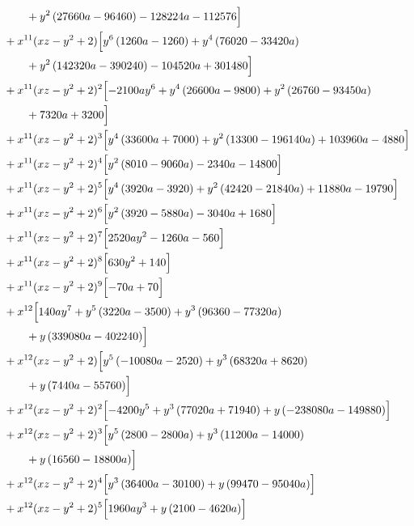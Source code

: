 \begin{align*}
&\qquad + y^{2} \left(27660 a - 96460\right) - 128224 a - 112576\Bigr]\\
&{}+x^{11}(xz-y^2+2)\Bigl[y^{6} \left(1260 a - 1260\right) + y^{4} \left(76020 - 33420 a\right)\\
&\qquad + y^{2} \left(142320 a - 390240\right) - 104520 a + 301480\Bigr]\\
&{}+x^{11}(xz-y^2+2)^{2}\Bigl[- 2100 a y^{6} + y^{4} \left(26600 a - 9800\right) + y^{2} \left(26760 - 93450 a\right)\\
&\qquad + 7320 a + 3200\Bigr]\\
&{}+x^{11}(xz-y^2+2)^{3}\Bigl[y^{4} \left(33600 a + 7000\right) + y^{2} \left(13300 - 196140 a\right) + 103960 a - 4880\Bigr]\\
&{}+x^{11}(xz-y^2+2)^{4}\Bigl[y^{2} \left(8010 - 9060 a\right) - 2340 a - 14800\Bigr]\\
&{}+x^{11}(xz-y^2+2)^{5}\Bigl[y^{4} \left(3920 a - 3920\right) + y^{2} \left(42420 - 21840 a\right) + 11880 a - 19790\Bigr]\\
&{}+x^{11}(xz-y^2+2)^{6}\Bigl[y^{2} \left(3920 - 5880 a\right) - 3040 a + 1680\Bigr]\\
&{}+x^{11}(xz-y^2+2)^{7}\Bigl[2520 a y^{2} - 1260 a - 560\Bigr]\\
&{}+x^{11}(xz-y^2+2)^{8}\Bigl[630 y^{2} + 140\Bigr]\\
&{}+x^{11}(xz-y^2+2)^{9}\Bigl[- 70 a + 70\Bigr]\\
&{}+x^{12}\Bigl[140 a y^{7} + y^{5} \left(3220 a - 3500\right) + y^{3} \left(96360 - 77320 a\right)\\
&\qquad + y \left(339080 a - 402240\right)\Bigr]\\
&{}+x^{12}(xz-y^2+2)\Bigl[y^{5} \left(- 10080 a - 2520\right) + y^{3} \left(68320 a + 8620\right)\\
&\qquad + y \left(7440 a - 55760\right)\Bigr]\\
&{}+x^{12}(xz-y^2+2)^{2}\Bigl[- 4200 y^{5} + y^{3} \left(77020 a + 71940\right) + y \left(- 238080 a - 149880\right)\Bigr]\\
&{}+x^{12}(xz-y^2+2)^{3}\Bigl[y^{5} \left(2800 - 2800 a\right) + y^{3} \left(11200 a - 14000\right)\\
&\qquad + y \left(16560 - 18800 a\right)\Bigr]\\
&{}+x^{12}(xz-y^2+2)^{4}\Bigl[y^{3} \left(36400 a - 30100\right) + y \left(99470 - 95040 a\right)\Bigr]\\
&{}+x^{12}(xz-y^2+2)^{5}\Bigl[1960 a y^{3} + y \left(2100 - 4620 a\right)\Bigr]\\

\end{align*}
